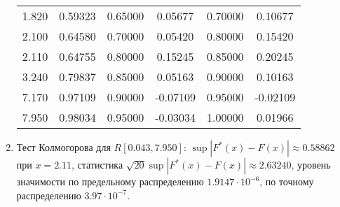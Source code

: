 \documentclass[a4paper,12pt]{article}
\newcommand{\modulus}[1]{\left | #1 \right |}
\begin{document}
\begin{enumerate}
\begin{tabular}{|c|c|c|c|c|c|}
                  1.820 & 0.59323 & 0.65000  & 0.05677                   & 0.70000    & 0.10677           \\
                  2.100 & 0.64580 & 0.70000  & 0.05420                   & 0.80000    & 0.15420           \\
                  2.110 & 0.64755 & 0.80000  & 0.15245                   & 0.85000    & 0.20245           \\
                  3.240 & 0.79837 & 0.85000  & 0.05163                   & 0.90000    & 0.10163           \\
                  7.170 & 0.97109 & 0.90000  & -0.07109                  & 0.95000    & -0.02109          \\
                  7.950 & 0.98034 & 0.95000  & -0.03034                  & 1.00000    & 0.01966           \\
                  \hline
              \end{tabular}

        \item Тест Колмогорова для $R[0.043, 7.950]$: $\sup \modulus{F^*(x) - F(x)} \approx 0.58862$ при $x = 2.11$, статистика
              $\sqrt{20} \sup \modulus{F^*(x) - F(x)} \approx 2.63240$, уровень значимости по предельному распределению $1.9147 \cdot 10^{-6}$,
              по точному распределению $3.97 \cdot 10^{-7}$.


\end{enumerate}
\end{document}
